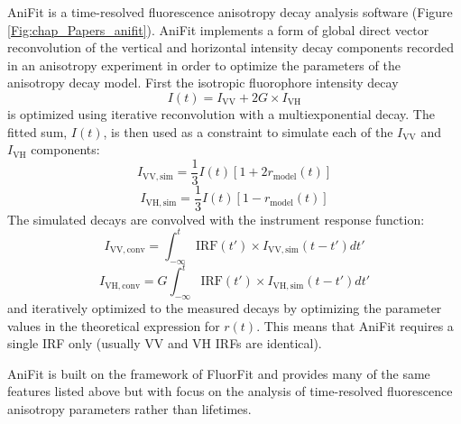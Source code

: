  AniFit is a time-resolved fluorescence anisotropy decay analysis software (Figure \ref{Fig:chap_Papers_anifit}). AniFit implements a form of global direct vector reconvolution of the vertical and horizontal intensity decay components recorded in an anisotropy experiment in order to optimize the parameters of the anisotropy decay model. First the isotropic fluorophore intensity decay
\[
 I(t) = I_\mathrm{VV} + 2G\times I_\mathrm{VH}
\]
 is optimized using iterative reconvolution with a multiexponential decay. The fitted sum, $I(t)$, is then used as a constraint to simulate each of the $I_\mathrm{VV}$ and $I_\mathrm{VH}$ components:
\[
 I_\mathrm{VV,sim} = \frac{1}{3}I(t)\left[1+2r_\mathrm{model}(t)\right]
\]
\[
 I_\mathrm{VH,sim} = \frac{1}{3}I(t)\left[1-r_\mathrm{model}(t)\right]
\]
 The simulated decays are convolved with the instrument response function:
\[
 I_\mathrm{VV,conv} = \int_{-\infty}^t\mathrm{IRF}(t')\times I_\mathrm{VV,sim}(t-t')dt'
\]
\[
 I_\mathrm{VH,conv} = G\int_{-\infty}^t\mathrm{IRF}(t')\times I_\mathrm{VH,sim}(t-t')dt'
\]
 and iteratively optimized to the measured decays by optimizing the parameter values in the theoretical expression for $r(t)$. This means that AniFit requires a single IRF only (usually VV and VH IRFs are identical).

 AniFit is built on the framework of FluorFit and provides many of the same features listed above but with focus on the analysis of time-resolved fluorescence anisotropy parameters rather than lifetimes.

